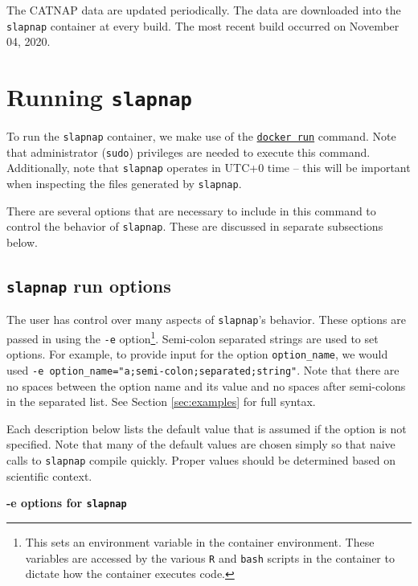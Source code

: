 \documentclass[]{article}
\begin{document}
The CATNAP data are updated periodically. The data are downloaded into
the \texttt{slapnap} container at every build. The most recent build
occurred on November 04, 2020.

\section{\texorpdfstring{Running
\texttt{slapnap}}{Running slapnap}}\label{sec:runningcontainer}

To run the \texttt{slapnap} container, we make use of the
\href{https://docs.docker.com/engine/reference/run/}{\texttt{docker\ run}}
command. Note that administrator (\texttt{sudo}) privileges are needed
to execute this command. Additionally, note that \texttt{slapnap}
operates in UTC+0 time -- this will be important when inspecting the
files generated by \texttt{slapnap}.

There are several options that are necessary to include in this command
to control the behavior of \texttt{slapnap}. These are discussed in
separate subsections below.

\subsection{\texorpdfstring{\texttt{slapnap} run
options}{slapnap run options}}\label{sec:opts}

The user has control over many aspects of \texttt{slapnap}'s behavior.
These options are passed in using the \texttt{-e} option\footnote{This
  sets an environment variable in the container environment. These
  variables are accessed by the various \texttt{R} and \texttt{bash}
  scripts in the container to dictate how the container executes code.}.
Semi-colon separated strings are used to set options. For example, to
provide input for the option \texttt{option\_name}, we would used
\texttt{-e\ option\_name="a;semi-colon;separated;string"}. Note that
there are no spaces between the option name and its value and no spaces
after semi-colons in the separated list. See Section \ref{sec:examples}
for full syntax.

Each description below lists the default value that is assumed if the
option is not specified. Note that many of the default values are chosen
simply so that naive calls to \texttt{slapnap} compile quickly. Proper
values should be determined based on scientific context.

\textbf{-e options for \texttt{slapnap}}
\end{document}
